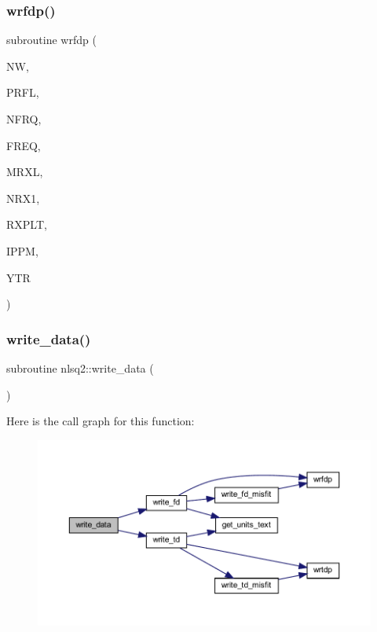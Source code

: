 \subsubsection{\texorpdfstring{wrfdp()}{wrfdp()}}
{\footnotesize\ttfamily subroutine wrfdp (\begin{DoxyParamCaption}\item[{integer}]{NW,  }\item[{integer}]{P\+R\+FL,  }\item[{integer}]{N\+F\+RQ,  }\item[{real, dimension(nfrq)}]{F\+R\+EQ,  }\item[{integer}]{M\+R\+XL,  }\item[{integer}]{N\+R\+X1,  }\item[{real(kind=ql), dimension(3,mrxl)}]{R\+X\+P\+LT,  }\item[{integer}]{I\+P\+PM,  }\item[{real, dimension(nfrq,nrx1)}]{Y\+TR }\end{DoxyParamCaption})}

\mbox{\label{Leroi__c_8f90_a8213ad17958b78aad4a7bec6b845606b}} 
\subsubsection{\texorpdfstring{write\+\_\+data()}{write\_data()}}
{\footnotesize\ttfamily subroutine nlsq2\+::write\+\_\+data (\begin{DoxyParamCaption}{ }\end{DoxyParamCaption})}

Here is the call graph for this function\+:\nopagebreak
\begin{figure}[H]
\begin{center}
\leavevmode
\includegraphics[width=350pt]{Leroi__c_8f90_a8213ad17958b78aad4a7bec6b845606b_cgraph}
\end{center}
\end{figure}
\mbox{\label{Leroi__c_8f90_ab3f62aa9d1d60322e81296cc809df15f}} 
